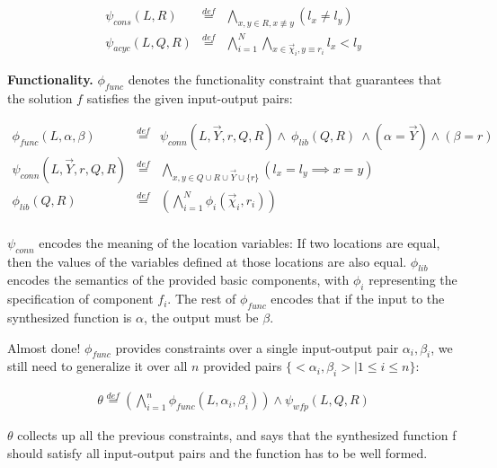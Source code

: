 \documentclass[11pt]{article}
\begin{document}
\[
\begin{array}{rcl}
\psi_{cons}(L,R) & \stackrel{def}{=} & \bigwedge\limits_{x,y \in R, x\not\equiv y} (l_x \neq l_y)  \\[0.5em]
\psi_{acyc}(L,Q,R) & \stackrel{def}= & \bigwedge\limits_{i=1}^N \bigwedge\limits_{x \in\overrightarrow{\chi}_i, y \equiv r_i} l_x < l_y
\end{array}
\]

\vspace{0.75em}
 \noindent\textbf{Functionality.} $\phi_{func}$ denotes the functionality constraint that guarantees that the solution $f$ satisfies the given input-output pairs:
 
 \[
 \begin{array}{rcl}
 \phi_{func}(L,\alpha,\beta) & \stackrel{def}{=} & \psi_{conn}(L, \overrightarrow{Y}, r, Q, R) \wedge ~ \phi_{lib}(Q,R) ~\wedge (\alpha = \overrightarrow{Y}) \wedge (\beta = r) \\ [0.5em]
 
  \psi_{conn}(L,\overrightarrow{Y},r,Q,R) & \stackrel{def}{=} & \bigwedge \limits_{x,y \in Q \cup R \cup \overrightarrow{Y} \cup \{ r \}} (l_x = l_y \implies x = y) \\ [0.5em]
     
 \phi_{lib}(Q,R) & \stackrel{def}{=} & ( \bigwedge\limits_{i=1}^{N} 
 \phi_i  (\overrightarrow{\chi}_i,  r_i)) \\ 
 
 \end{array}
 \]
 
 $\psi_{conn}$ encodes the meaning of the location variables: If two locations are equal, then the values of the variables defined at those locations are also equal.  $\phi_{lib}$ encodes the semantics of the provided basic components, with $\phi_i$ representing the specification of component $f_i$.  The rest of $\phi_{func}$ encodes that if the input to the synthesized function is $\alpha$, the output must be $\beta$.  
 
 Almost done!  $\phi_{func}$ provides constraints over a single input-output pair $\alpha_i, \beta_i$, we still need to generalize it over all $n$ provided pairs $\{ < \alpha_i, \beta_i > | 1 \leq i \leq n \}$:
 
 \[
 \begin{array}{c}
 \theta \stackrel{def}{=} ( \bigwedge \limits_{i=1}^n \phi_{func}(L, \alpha_i, \beta_i)) \wedge \psi_{wfp}(L, Q,R)
 \end{array}
 \]

$\theta$ collects up all the previous constraints, and says that the synthesized function f should satisfy all input-output pairs and the function has to be well formed.  
\end{document}

